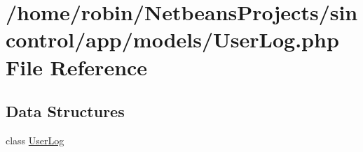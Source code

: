 \hypertarget{_user_log_8php}{}\section{/home/robin/\+Netbeans\+Projects/sincontrol/app/models/\+User\+Log.php File Reference}
\label{_user_log_8php}
\subsection*{Data Structures}
\begin{DoxyCompactItemize}
\item 
class \hyperlink{class_user_log}{User\+Log}
\end{DoxyCompactItemize}
